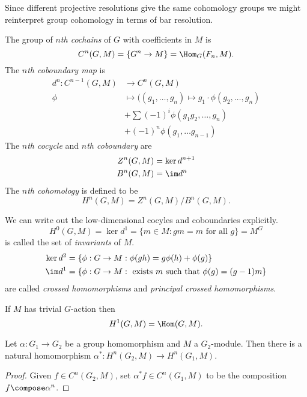 \documentclass[a4paper]{article}
\begin{document}
Since different projective resolutions give the same cohomology groups we might reinterpret group cohomology in terms of bar resolution.

\begin{definition}
  The group of \emph{\(n\)th cochains} of \(G\) with coefficients in \(M\) is
  \[
    C^n(G, M) = \{G^n \to M\} = \Hom_G(F_n, M).
  \]
  The \emph{\(n\)th coboundary map} is
  \begin{align*}
    d^n: C^{n - 1}(G, M) &\to C^n(G, M) \\
    \phi &\mapsto ((g_1, \dots, g_n) \mapsto g_1 \cdot \phi(g_2, \dots, g_n) \\
                         &+ \sum (-1)^i \phi(g_1g_2, \dots, g_n) \\
                         &+ (-1)^n \phi(g_1, \dots g_{n - 1})
  \end{align*}
  The \emph{\(n\)th cocycle} and \emph{\(n\)th coboundary} are
  \begin{align*}
    Z^n(G, M) &= \ker d^{n + 1} \\
    B^n(G, M) &= \im d^n
  \end{align*}
  The \emph{\(n\)th cohomology} is defined to be
  \[
    H^n(G, M) = Z^n(G, M)/B^n(G, M).
  \]
\end{definition}

We can write out the low-dimensional cocyles and coboundaries explicitly.
\[
  H^0(G, M) = \ker d^1 = \{m \in M: gm = m \text{ for all } g\} = M^G
\]
is called the set of \emph{invariants} of \(M\).
\begin{align*}
  \ker d^2 &= \{\phi: G \to M: \phi(gh) = g \phi(h) + \phi(g)\} \\
  \im d^1 &= \{\phi: G \to M: \text{ exists } m \text{ such that } \phi(g) = (g - 1)m\}
\end{align*}
are called \emph{crossed homomorphisms} and \emph{principal crossed homomorphisms}.

\begin{eg}
  If \(M\) has trivial \(G\)-action then
  \[
    H^1(G, M) = \Hom(G, M).
  \]
\end{eg}

\begin{proposition}
  Let \(\alpha: G_1 \to G_2\) be a group homomorphism and \(M\) a \(G_2\)-module. Then there is a natural homomorphism \(\alpha^*: H^n(G_2, M) \to H^n(G_1, M)\).
\end{proposition}

\begin{proof}
  Given \(f \in C^n(G_2, M)\), set \(\alpha^*f \in C^n(G_1, M)\) to be the composition \(f \compose \alpha^n\).
\end{proof}
\end{document}
